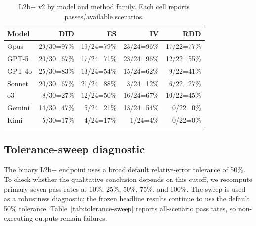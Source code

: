 \documentclass{article}
\begin{document}
\begin{table}[h]
\centering
\caption{L2b+ v2 by model and method family. Each cell reports
passes/available scenarios.}
\label{tab:l2b-method}
\small
\renewcommand{\arraystretch}{1.08}
\begin{tabular}{lrrrr}
\toprule
\textbf{Model} & \textbf{DID} & \textbf{ES} & \textbf{IV} & \textbf{RDD} \\
\midrule
Opus & 29/30=97\% & 19/24=79\% & 23/24=96\% & 17/22=77\% \\
GPT-5 & 20/30=67\% & 17/24=71\% & 23/24=96\% & 12/22=55\% \\
GPT-4o & 25/30=83\% & 13/24=54\% & 15/24=62\% & 9/22=41\% \\
Sonnet & 20/30=67\% & 21/24=88\% & 3/24=12\% & 6/22=27\% \\
o3 & 8/30=27\% & 12/24=50\% & 16/24=67\% & 10/22=45\% \\
Gemini & 14/30=47\% & 5/24=21\% & 13/24=54\% & 0/22=0\% \\
Kimi & 5/30=17\% & 4/24=17\% & 1/24=4\% & 0/22=0\% \\
\bottomrule
\end{tabular}
\end{table}

\subsection{Tolerance-sweep diagnostic}
\label{app:tolerance_sweep}

The binary L2b+ endpoint uses a broad default relative-error tolerance of
50\%. To check whether the qualitative conclusion depends on this cutoff, we
recompute primary-seven pass rates at 10\%, 25\%, 50\%, 75\%, and 100\%. The
sweep is used as a robustness diagnostic; the frozen headline results continue
to use the default 50\% tolerance. Table~\ref{tab:tolerance-sweep} reports
all-scenario pass rates, so non-executing outputs remain failures.
\end{document}
